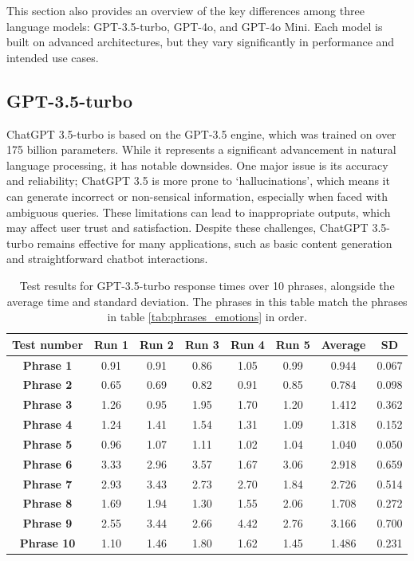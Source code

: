 This section also provides an overview of the key differences among three language models: GPT-3.5-turbo, GPT-4o, and GPT-4o Mini. Each model is built on advanced architectures, but they vary significantly in performance and intended use cases.

\subsection{GPT-3.5-turbo}

ChatGPT 3.5-turbo is based on the GPT-3.5 engine, which was trained on over 175 billion parameters. While it represents a significant advancement in natural language processing, it has notable downsides. One major issue is its accuracy and reliability; ChatGPT 3.5 is more prone to `hallucinations', which means it can generate incorrect or non-sensical information, especially when faced with ambiguous queries. These limitations can lead to inappropriate outputs, which may affect user trust and satisfaction. Despite these challenges, ChatGPT 3.5-turbo remains effective for many applications, such as basic content generation and straightforward chatbot interactions.

\begin{table}[h!]
\centering{}
\caption{Test results for GPT-3.5-turbo response times over 10 phrases, alongside the average time and standard deviation. The phrases in this table match the phrases in table \ref{tab:phrases_emotions} in order.}
\begin{tabular}{|c|c|c|c|c|c|c|c|}
\hline
\textbf{Test number} & \textbf{Run 1} & \textbf{Run 2} & \textbf{Run 3} & \textbf{Run 4} & \textbf{Run 5} & \textbf{Average} & \textbf{SD} \\ \hline
\textbf{Phrase 1} & 0.91 & 0.91 & 0.86 & 1.05 & 0.99 & 0.944 & 0.067          \\ \hline
\textbf{Phrase 2} & 0.65 & 0.69 & 0.82 & 0.91 & 0.85 & 0.784 & 0.098          \\ \hline
\textbf{Phrase 3} & 1.26 & 0.95 & 1.95 & 1.70 & 1.20 & 1.412 & 0.362          \\ \hline
\textbf{Phrase 4} & 1.24 & 1.41 & 1.54 & 1.31 & 1.09 & 1.318 & 0.152          \\ \hline
\textbf{Phrase 5} & 0.96 & 1.07 & 1.11 & 1.02 & 1.04 & 1.040 & 0.050          \\ \hline
\textbf{Phrase 6} & 3.33 & 2.96 & 3.57 & 1.67 & 3.06 & 2.918 & 0.659          \\ \hline
\textbf{Phrase 7} & 2.93 & 3.43 & 2.73 & 2.70 & 1.84 & 2.726 & 0.514          \\ \hline
\textbf{Phrase 8} & 1.69 & 1.94 & 1.30 & 1.55 & 2.06 & 1.708 & 0.272          \\ \hline
\textbf{Phrase 9} & 2.55 & 3.44 & 2.66 & 4.42 & 2.76 & 3.166 & 0.700          \\ \hline
\textbf{Phrase 10}& 1.10 & 1.46 & 1.80 & 1.62 & 1.45 & 1.486 & 0.231          \\ \hline
\end{tabular}
\label{tab:phrase_gpt3.5}
\end{table}

